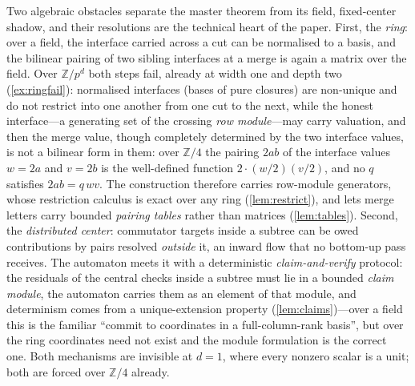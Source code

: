 \documentclass[a4paper,UKenglish,autoref,anonymous]{lipics-v2021}
\newcommand{\ZZ}{\mathbb{Z}}
\begin{document}
Two algebraic obstacles separate the master theorem from its field,
fixed-center shadow, and their resolutions are the technical heart of the
paper. First, the \emph{ring}: over a field, the interface carried across
a cut can be normalised to a basis, and the bilinear pairing of two
sibling interfaces at a merge is again a matrix over the field. Over
$\ZZ/p^d$ both steps fail, already at width one and depth two
(\autoref{ex:ringfail}): normalised interfaces (bases of pure closures)
are non-unique and do not restrict into one another from one cut to the
next, while the honest interface---a generating set of the crossing
\emph{row module}---may carry valuation, and then the merge value, though
completely determined by the two interface values, is not a bilinear form
in them: over $\ZZ/4$ the pairing $2ab$ of the interface values $w = 2a$
and $v = 2b$ is the well-defined function $2 \cdot (w/2)(v/2)$, and no
$q$ satisfies $2ab = q\,w v$. The construction therefore carries row-module
generators, whose restriction calculus is exact over any ring
(\autoref{lem:restrict}), and lets merge letters carry bounded
\emph{pairing tables} rather than matrices (\autoref{lem:tables}).
Second, the \emph{distributed center}: commutator targets inside a
subtree can be owed contributions by pairs resolved \emph{outside} it, an
inward flow that no bottom-up pass receives. The automaton meets it with
a deterministic \emph{claim-and-verify} protocol: the residuals of the
central checks inside a subtree must lie in a bounded \emph{claim module},
the automaton carries them as an element of that module, and determinism
comes from a unique-extension property (\autoref{lem:claims})---over a
field this is the familiar ``commit to coordinates in a full-column-rank
basis'', but over the ring coordinates need not exist and the module
formulation is the correct one. Both mechanisms are invisible at $d = 1$,
where every nonzero scalar is a unit; both are forced over $\ZZ/4$
already.
\end{document}
